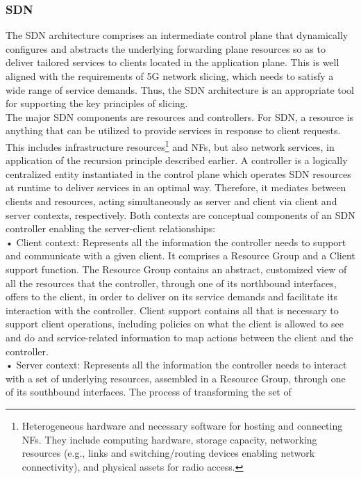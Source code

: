 \documentclass{article}
\begin{document}
\subsubsection{SDN}
The SDN architecture comprises an intermediate control plane that dynamically configures and abstracts the underlying
forwarding plane resources so as to deliver tailored services to clients located in the application plane. This is
well aligned with the requirements of 5G network
slicing, which needs to satisfy a wide range of service demands. Thus, the SDN architecture is an appropriate
tool for supporting the key principles of slicing.\\
The major SDN components are resources and controllers. For
SDN, a resource is anything that can be utilized to
provide services in response to client requests. This
includes infrastructure resources\footnote{Heterogeneous hardware and necessary software for hosting and connecting NFs. They include computing hardware,
storage capacity, networking resources (e.g., links
and switching/routing devices enabling network
connectivity), and physical assets for radio access.
} and NFs, but also
network services, in application of the recursion
principle described earlier. A controller is a logically centralized entity instantiated in the control
plane which operates SDN resources at runtime
to deliver services in an optimal way. Therefore,
it mediates between clients and resources, acting simultaneously as server and client via client
and server contexts, respectively. Both contexts
are conceptual components of an SDN controller
enabling the server-client relationships:\\
• Client context: Represents all the information the
controller needs to support and communicate with
a given client. It comprises a Resource Group and
a Client support function. The Resource Group contains an abstract, customized view of all the resources that the controller, through one of its northbound
interfaces, offers to the client, in order to deliver
on its service demands and facilitate its interaction
with the controller. Client support contains all that
is necessary to support client operations, including
policies on what the client is allowed to see and do and service-related information to map actions
between the client and the controller.\\
• Server context: Represents all the information the controller needs to interact with a set of
underlying resources, assembled in a Resource
Group, through one of its southbound interfaces.
The process of transforming the set of
\end{document}
